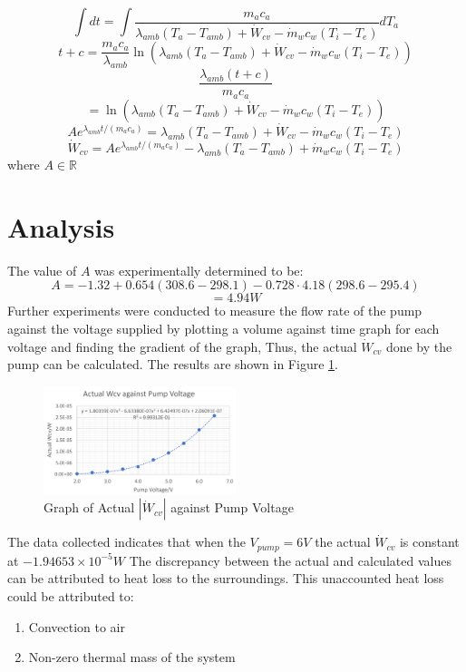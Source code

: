 \documentclass[10pt,a4paper]{IEEEtran}
\begin{document}
	$$\int dt = \int \frac{m_a c_a}{\lambda_{amb} \left( T_a - T_{amb} \right) + \dot{W}_{cv} - \dot{m}_w c_w \left( T_i - T_e \right)} dT_a$$
	$$t+ c = \frac{m_a c_a}{\lambda_{amb}} \ln(\lambda_{amb} \left( T_a - T_{amb} \right) + \dot{W}_{cv} - \dot{m}_w c_w \left( T_i - T_e \right))$$
	$$\frac{\lambda_{amb} \left( t + c \right)}{m_a c_a}$$  
	$$= \ln(\lambda_{amb} \left( T_a - T_{amb} \right) + \dot{W}_{cv} - \dot{m}_w c_w \left( T_i - T_e \right))$$
	$$Ae^{\lambda_{amb} t/(m_a c_a)} = \lambda_{amb} \left( T_a - T_{amb} \right) + \dot{W}_{cv} - \dot{m}_w c_w \left( T_i - T_e \right)$$
	$$\dot{W}_{cv} = Ae^{\lambda_{amb} t/(m_a c_a)} - \lambda_{amb} \left( T_a - T_{amb} \right) + \dot{m}_w c_w \left( T_i - T_e \right)$$
	where $A \in \mathbb{R}$
	
	\section{Analysis}
	The value of $A$ was experimentally determined to be:
	$$A = -1.32 + 0.654(308.6-298.1) - 0.728\cdot 4.18(298.6-295.4)$$
	$$= 4.94 W$$
	Further experiments were conducted to measure the flow rate of the pump against the voltage supplied by plotting a volume against time graph for each voltage and finding the gradient of the graph, Thus, the actual $\dot{W}_{cv}$ done by the pump can be calculated. The results are shown in Figure \ref{fig:actual_Wcv}.
	\begin{figure}[H]
		\begin{center}
			\includegraphics[width=0.5\textwidth]{graph_actualWcvAgainstVoltage.png}
			\caption{Graph of Actual $|\dot{W}_{cv}|$ against Pump Voltage}
			\label{fig:actual_Wcv}
		\end{center}
	\end{figure}
	The data collected indicates that when the $V_{pump} = 6V$ the actual $\dot{W}_{cv}$ is constant at $-1.94653\times 10^{-5} W$  The discrepancy between the actual and calculated values can be attributed to heat loss to the surroundings. This unaccounted heat loss could be attributed to:
	\begin{enumerate}
		\item Convection to air
		\item Non-zero thermal mass of the system
	\end{enumerate}

	
	
	
	
\end{document}

